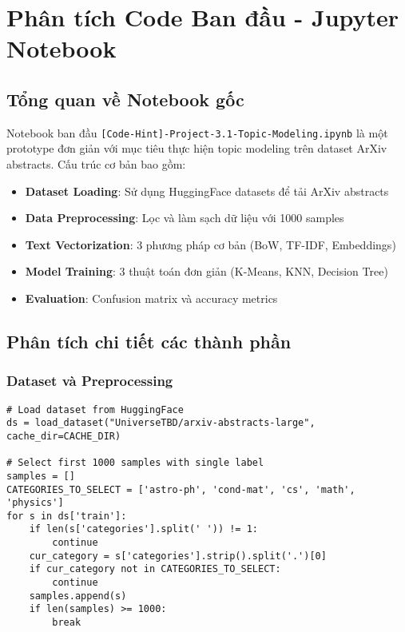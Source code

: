 \section{Phân tích Code Ban đầu - Jupyter Notebook}

\subsection{Tổng quan về Notebook gốc}

Notebook ban đầu \texttt{[Code-Hint]-Project-3.1-Topic-Modeling.ipynb} là một prototype đơn giản với mục tiêu thực hiện topic modeling trên dataset ArXiv abstracts. Cấu trúc cơ bản bao gồm:

\begin{itemize}
    \item \textbf{Dataset Loading}: Sử dụng HuggingFace datasets để tải ArXiv abstracts
    \item \textbf{Data Preprocessing}: Lọc và làm sạch dữ liệu với 1000 samples
    \item \textbf{Text Vectorization}: 3 phương pháp cơ bản (BoW, TF-IDF, Embeddings)
    \item \textbf{Model Training}: 3 thuật toán đơn giản (K-Means, KNN, Decision Tree)
    \item \textbf{Evaluation}: Confusion matrix và accuracy metrics
\end{itemize}

\subsection{Phân tích chi tiết các thành phần}

\subsubsection{Dataset và Preprocessing}

\begin{verbatim}
# Load dataset from HuggingFace
ds = load_dataset("UniverseTBD/arxiv-abstracts-large", cache_dir=CACHE_DIR)

# Select first 1000 samples with single label
samples = []
CATEGORIES_TO_SELECT = ['astro-ph', 'cond-mat', 'cs', 'math', 'physics']
for s in ds['train']:
    if len(s['categories'].split(' ')) != 1:
        continue
    cur_category = s['categories'].strip().split('.')[0]
    if cur_category not in CATEGORIES_TO_SELECT:
        continue
    samples.append(s)
    if len(samples) >= 1000:
        break
\end{verbatim}

